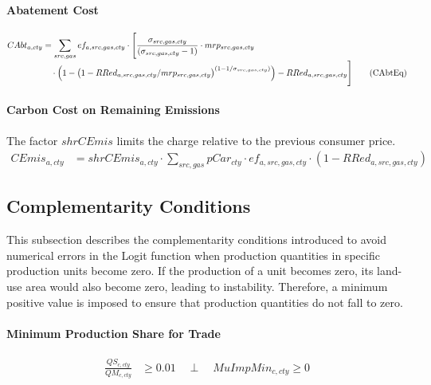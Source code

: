 \paragraph{Abatement Cost}
\begin{align}
  CAbt_{a,cty}
  &= \sum_{src,gas}
     ef_{a,src,gas,cty}
     \cdot
     \Biggl[
       \frac{\sigma_{src,gas,cty}}
            {(\sigma_{src,gas,cty}-1)}
       \cdot
       mrp_{src,gas,cty}
       \nonumber\\[-0.3em]
  &\quad
       \cdot
       \Bigl(
         1 -
         \bigl(
           1 -
           RRed_{a,src,gas,cty} /
           mrp_{src,gas,cty}
         \bigr)^{(1 - 1/\sigma_{src,gas,cty})}
       \Bigr)
       - RRed_{a,src,gas,cty}
     \Biggr]
  \tag{CAbtEq}\label{eq:CAbtEq}
\end{align}

\paragraph{Carbon Cost on Remaining Emissions}
The factor \(shrCEmis\) limits the charge relative to the previous consumer price.
\begin{align}
  CEmis_{a,cty}
  &= shrCEmis_{a,cty}\cdot\sum_{src,gas}
     pCar_{cty}
     \cdot
     ef_{a,src,gas,cty}
     \cdot
     (1 - RRed_{a,src,gas,cty})
  \tag{CEmisEq}\label{eq:CEmisEq}
\end{align}


\subsection{Complementarity Conditions}

This subsection describes the complementarity conditions introduced to avoid numerical errors in the Logit function when production quantities in specific production units become zero.  
If the production of a unit becomes zero, its land-use area would also become zero, leading to instability.  
Therefore, a minimum positive value is imposed to ensure that production quantities do not fall to zero.

\paragraph{Minimum Production Share for Trade}
\begin{align}
  \frac{QS_{c,cty}}{QM_{c,cty}}
  &\ge 0.01
  \quad \perp \quad
  MuImpMin_{c,cty} \ge 0
  \tag{ImpMinEq}\label{eq:ImpMinEq}
\end{align}

